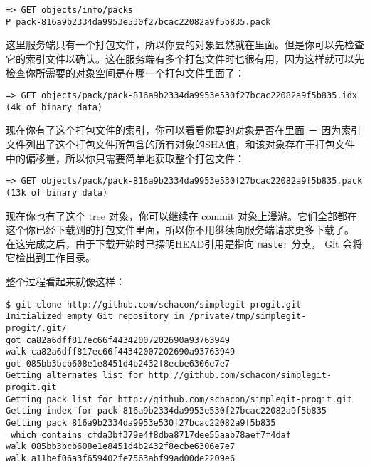 \documentclass[a4paper]{book}
\begin{document}
\begin{shaded}\begin{verbatim}
=> GET objects/info/packs
P pack-816a9b2334da9953e530f27bcac22082a9f5b835.pack
\end{verbatim}\end{shaded}

这里服务端只有一个打包文件，所以你要的对象显然就在里面。但是你可以先检查它的索引文件以确认。这在服务端有多个打包文件时也很有用，因为这样就可以先检查你所需要的对象空间是在哪一个打包文件里面了：

\begin{shaded}\begin{verbatim}
=> GET objects/pack/pack-816a9b2334da9953e530f27bcac22082a9f5b835.idx
(4k of binary data)
\end{verbatim}\end{shaded}

现在你有了这个打包文件的索引，你可以看看你要的对象是否在里面 － 因为索引文件列出了这个打包文件所包含的所有对象的SHA值，和该对象存在于打包文件中的偏移量，所以你只需要简单地获取整个打包文件：

\begin{shaded}\begin{verbatim}
=> GET objects/pack/pack-816a9b2334da9953e530f27bcac22082a9f5b835.pack
(13k of binary data)
\end{verbatim}\end{shaded}

现在你也有了这个 tree 对象，你可以继续在 commit 对象上漫游。它们全部都在这个你已经下载到的打包文件里面，所以你不用继续向服务端请求更多下载了。 在这完成之后，由于下载开始时已探明HEAD引用是指向 \texttt{master} 分支， Git 会将它检出到工作目录。

整个过程看起来就像这样：

\begin{shaded}\begin{verbatim}
$ git clone http://github.com/schacon/simplegit-progit.git
Initialized empty Git repository in /private/tmp/simplegit-progit/.git/
got ca82a6dff817ec66f44342007202690a93763949
walk ca82a6dff817ec66f44342007202690a93763949
got 085bb3bcb608e1e8451d4b2432f8ecbe6306e7e7
Getting alternates list for http://github.com/schacon/simplegit-progit.git
Getting pack list for http://github.com/schacon/simplegit-progit.git
Getting index for pack 816a9b2334da9953e530f27bcac22082a9f5b835
Getting pack 816a9b2334da9953e530f27bcac22082a9f5b835
 which contains cfda3bf379e4f8dba8717dee55aab78aef7f4daf
walk 085bb3bcb608e1e8451d4b2432f8ecbe6306e7e7
walk a11bef06a3f659402fe7563abf99ad00de2209e6
\end{verbatim}\end{shaded}
\end{document}

